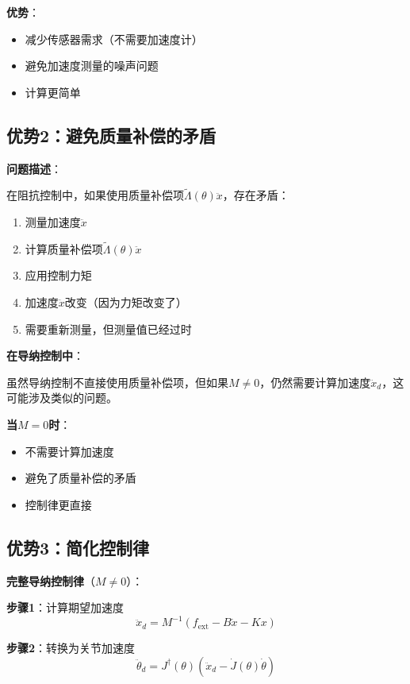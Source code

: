 \documentclass[12pt,a4paper]{article}
\begin{document}
\textbf{优势}：
\begin{itemize}
\item 减少传感器需求（不需要加速度计）
\item 避免加速度测量的噪声问题
\item 计算更简单
\end{itemize}

\subsection{优势2：避免质量补偿的矛盾}

\textbf{问题描述}：

在阻抗控制中，如果使用质量补偿项$\tilde{\Lambda}(\theta)\ddot{x}$，存在矛盾：
\begin{enumerate}
\item 测量加速度$\ddot{x}$
\item 计算质量补偿项$\tilde{\Lambda}(\theta)\ddot{x}$
\item 应用控制力矩
\item 加速度$\ddot{x}$改变（因为力矩改变了）
\item 需要重新测量，但测量值已经过时
\end{enumerate}

\textbf{在导纳控制中}：

虽然导纳控制不直接使用质量补偿项，但如果$M \neq 0$，仍然需要计算加速度$\ddot{x}_d$，这可能涉及类似的问题。

\textbf{当$M = 0$时}：
\begin{itemize}
\item 不需要计算加速度
\item 避免了质量补偿的矛盾
\item 控制律更直接
\end{itemize}

\subsection{优势3：简化控制律}

\textbf{完整导纳控制律}（$M \neq 0$）：

\textbf{步骤1}：计算期望加速度
\begin{equation}
\ddot{x}_d = M^{-1}(f_{\text{ext}} - B\dot{x} - Kx)
\end{equation}

\textbf{步骤2}：转换为关节加速度
\begin{equation}
\ddot{\theta}_d = J^{\dagger}(\theta)(\ddot{x}_d - \dot{J}(\theta)\dot{\theta})
\end{equation}
\end{document}
